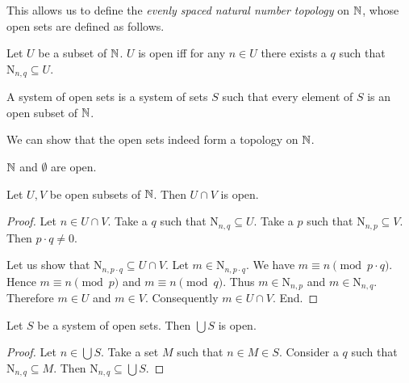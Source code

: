 \documentclass{article}
\newcommand{\N}{\mathrm{N}}
\begin{document}
  This allows us to define the \textit{evenly spaced natural number
  topology} on $\mathbb{N}$, whose open sets are defined as follows.

  \begin{forthel}
    \begin{definition}
      Let $U$ be a subset of $\mathbb{N}$.
      $U$ is open iff for any $n \in U$ there exists a $q$ such that
      $\N_{n, q} \subseteq U$.
    \end{definition}

    \begin{definition}
      A system of open sets is a system of sets $S$ such that every element of
      $S$ is an open subset of $\mathbb{N}$.
    \end{definition}
  \end{forthel}

  We can show that the open sets indeed form a topology on $\mathbb{N}$.

  \begin{forthel}
    \begin{lemma}
      $\mathbb{N}$ and $\emptyset$ are open.
    \end{lemma}

    \begin{lemma}
      Let $U,V$ be open subsets of $\mathbb{N}$.
      Then $U \cap V$ is open.
    \end{lemma}
    \begin{proof}
      Let $n \in U \cap V$.
      Take a $q$ such that $\N_{n, q} \subseteq U$.
      Take a $p$ such that $\N_{n, p} \subseteq V$.
      Then $p \cdot q \neq 0$.

      Let us show that $\N_{n, p \cdot q} \subseteq U \cap V$.
        Let $m \in \N_{n, p \cdot q}$.
        We have $m \equiv n \pmod{p \cdot q}$.
        Hence $m \equiv n \pmod{p}$ and $m \equiv n \pmod{q}$.
        Thus $m \in \N_{n, p}$ and $m \in \N_{n, q}$.
        Therefore $m \in U$ and $m \in V$.
        Consequently $m \in U \cap V$.
      End.
    \end{proof}

    \begin{lemma}
      Let $S$ be a system of open sets.
      Then $\bigcup S$ is open.
    \end{lemma}
    \begin{proof}
      Let $n \in \bigcup S$.
      Take a set $M$ such that $n \in M \in S$.
      Consider a $q$ such that $\N_{n, q} \subseteq M$.
      Then $\N_{n, q} \subseteq \bigcup S$.
    \end{proof}
  \end{forthel}
\end{document}
